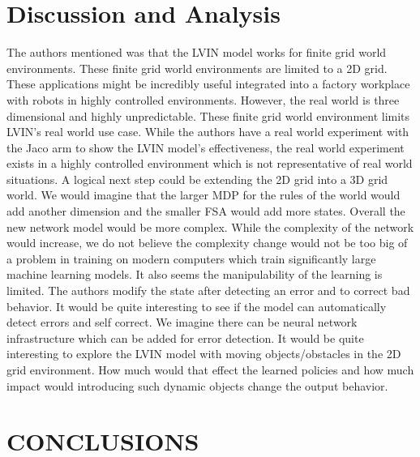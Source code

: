 \documentclass[letterpaper, 10 pt, conference]{ieeeconf}  %
\begin{document}
\section{Discussion and Analysis}
The authors mentioned was that the LVIN model works for finite grid world environments. These finite grid world environments are limited to a 2D grid. These applications might be incredibly useful integrated into a factory workplace with robots in highly controlled environments.
\newline
\indent However, the real world is three dimensional and highly unpredictable. These finite grid world environment limits LVIN's real world use case. While the authors have a real world experiment with the Jaco arm to show the LVIN model's effectiveness, the real world experiment exists in a highly controlled environment which is not representative of real world situations.
\newline
\indent A logical next step could be extending the 2D grid into a 3D grid world. We would imagine that the larger MDP for the rules of the world would add another dimension and the smaller FSA would add more states. Overall the new network model would be more complex. While the complexity of the network would increase, we do not believe the complexity change would not be too big of a problem in training on modern computers which train significantly large machine learning models.
\newline
\indent It also seems the manipulability of the learning is limited. The authors modify the state after detecting an error and to correct bad behavior. It would be quite interesting to see if the model can automatically detect errors and self correct. We imagine there can be neural network infrastructure which can be added for error detection.
\newline
\indent It would be quite interesting to explore the LVIN model with moving objects/obstacles in the 2D grid environment. How much would that effect the learned policies and how much impact would introducing such dynamic objects change the output behavior.


\section{CONCLUSIONS}
\end{document}
